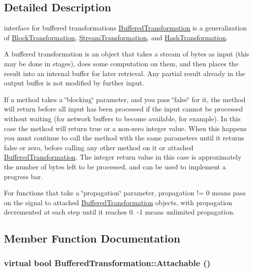 \subsection{Detailed Description}
interface for buffered transformations \hyperlink{class_buffered_transformation}{BufferedTransformation} is a generalization of \hyperlink{class_block_transformation}{BlockTransformation}, \hyperlink{class_stream_transformation}{StreamTransformation}, and \hyperlink{class_hash_transformation}{HashTransformation}.

A buffered transformation is an object that takes a stream of bytes as input (this may be done in stages), does some computation on them, and then places the result into an internal buffer for later retrieval. Any partial result already in the output buffer is not modified by further input.

If a method takes a \char`\"{}blocking\char`\"{} parameter, and you pass \char`\"{}false\char`\"{} for it, the method will return before all input has been processed if the input cannot be processed without waiting (for network buffers to become available, for example). In this case the method will return true or a non-\/zero integer value. When this happens you must continue to call the method with the same parameters until it returns false or zero, before calling any other method on it or attached \hyperlink{class_buffered_transformation}{BufferedTransformation}. The integer return value in this case is approximately the number of bytes left to be processed, and can be used to implement a progress bar.

For functions that take a \char`\"{}propagation\char`\"{} parameter, propagation != 0 means pass on the signal to attached \hyperlink{class_buffered_transformation}{BufferedTransformation} objects, with propagation decremented at each step until it reaches 0. -\/1 means unlimited propagation. 

\subsection{Member Function Documentation}
\hypertarget{class_buffered_transformation_a20112606fc006c56f1561653cabd9542}{
\subsubsection[{Attachable}]{\setlength{\rightskip}{0pt plus 5cm}virtual bool BufferedTransformation::Attachable ()}}
\label{class_buffered_transformation_a20112606fc006c56f1561653cabd9542}



